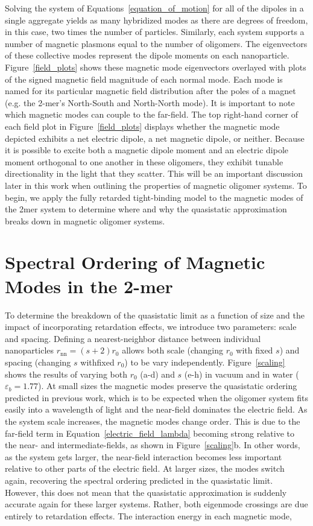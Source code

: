 \documentclass[journal=apchd5,manuscript=article]{achemso}
\begin{document}
Solving the system of Equations~\ref{equation_of_motion} for all of the dipoles in a single aggregate yields as many hybridized modes as there are degrees of freedom, in this case, two times the number of particles. Similarly, each system supports a number of magnetic plasmons equal to the number of oligomers. The eigenvectors of these collective modes represent the dipole moments on each nanoparticle. Figure~\ref{field_plots} shows these magnetic mode eigenvectors overlayed with plots of the signed magnetic field magnitude of each normal mode. Each mode is named for its particular magnetic field distribution after the poles of a magnet (e.g. the 2-mer's North-South and North-North mode). It is important to note which magnetic modes can couple to the far-field. The top right-hand corner of each field plot in Figure~\ref{field_plots} displays whether the magnetic mode depicted exhibits a net electric dipole, a net magnetic dipole, or neither. Because it is possible to excite both a magnetic dipole moment and an electric dipole moment orthogonal to one another in these oligomers, they exhibit tunable directionality in the light that they scatter. This will be an important discussion later in this work when outlining the properties of magnetic oligomer systems. To begin, we apply the fully retarded tight-binding model to the magnetic modes of the 2mer system to determine where and why the quasistatic approximation breaks down in magnetic oligomer systems.

\section{Spectral Ordering of Magnetic Modes in the 2-mer}
To determine the breakdown of the quasistatic limit as a function of size and the impact of incorporating retardation effects, we introduce two parameters: scale and spacing. Defining a nearest-neighbor distance between individual nanoparticles $r_{\textrm{nn}} = (s + 2)r_0$ allows both scale (changing $r_0$ with fixed $s$) and spacing (changing $s$ withfixed $r_0$) to be vary independently. Figure~\ref{scaling} shows the results of varying both $r_0$ (a-d) and $s$ (e-h) in vacuum and in water ($\varepsilon_b = 1.77$). At small sizes the magnetic modes preserve the quasistatic ordering predicted in previous work, which is to be expected when the oligomer system fits easily into a wavelength of light and the near-field dominates the electric field.\cite{Cherqui2014} As the system scale increases, the magnetic modes change order. This is due to the far-field term in Equation~\ref{electric_field_lambda} becoming strong relative to the near- and intermediate-fields, as shown in Figure~\ref{scaling}b. In other words, as the system gets larger, the near-field interaction becomes less important relative to other parts of the electric field. At larger sizes, the modes switch again, recovering the spectral ordering predicted in the quasistatic limit. However, this does not mean that the quasistatic approximation is suddenly accurate again for these larger systems. Rather, both eigenmode crossings are due entirely to retardation effects. The interaction energy in each magnetic mode,
\end{document}
